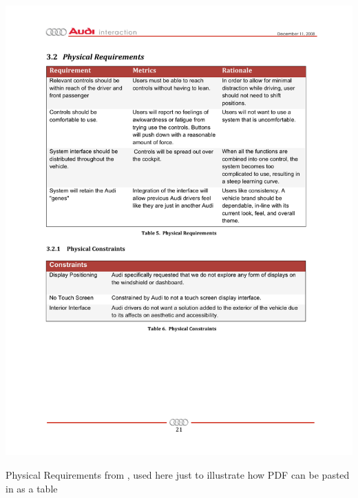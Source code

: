 \begin{remark}
\begin{table}[h]
	\centering
		\includegraphics[width=\textwidth]{Figures/Ch3/Audi08PhysReqs.pdf}
	\caption[A PDF table]{Physical Requirements from \cite{Audi2009Fall}, used here just to illustrate how PDF can be pasted in as a table
	}
	\label{tab:physical-requirements}
\end{table}

\end{remark}\normalcolor
